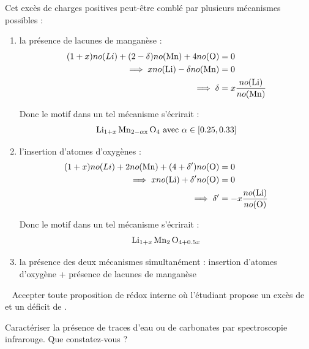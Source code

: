 \documentclass[twoside,a4paper,11pt,addpoints,answers]{exam}%
\begin{document}
\begin{questions}
\begin{mybox}
\begin{solution}[10cm]
Cet excès de charges positives peut-être comblé par plusieurs mécanismes possibles : 
\begin{enumerate}
\item la présence de lacunes de manganèse : 
\begin{align*}
(1+x) no (Li) +  (2-\delta) no ( \ce{Mn} ) + 4 no ( \ce{O} ) &= 0 \\
\implies x no ( \ce{Li} ) - \delta no ( \ce{Mn} ) &= 0 \\
\implies \delta &= x \frac{no ( \ce{Li} )}{no ( \ce{Mn} )}
\end{align*}

Donc le motif dans un tel mécanisme s'écrirait :
\begin{align*}
 \ce{Li_{1+x} Mn_{2 - \alpha x} O4} \text{ avec } \alpha \in [0.25, 0.33]
\end{align*}

\item l'insertion d'atomes d'oxygènes :
\begin{align*}
(1+x) no (Li) +  2 no ( \ce{Mn} ) + (4+\delta') no ( \ce{O} ) &= 0 \\
\implies x no ( \ce{Li} ) + \delta'  no ( \ce{O} ) &= 0 \\
\implies \delta' &= - x \frac{no ( \ce{Li} )}{no ( \ce{O} )}
\end{align*}

Donc le motif dans un tel mécanisme s'écrirait :
\begin{align*}
 \ce{Li_{1+x} Mn_{2} O_{4+0.5x}}
\end{align*}

\item la présence des deux mécanismes simultanément : insertion d'atomes d'oxygène + présence de lacunes de manganèse

\end{enumerate}

\faWarning ~ Accepter toute proposition de rédox interne où l'étudiant propose un excès de  et un déficit de .

\end{solution}\end{mybox}


\question[1\half] \label{Q:2-04} Caractériser la présence de traces d'eau ou de carbonates par spectroscopie infrarouge. Que constatez-vous ?


\end{questions}
\end{document}

